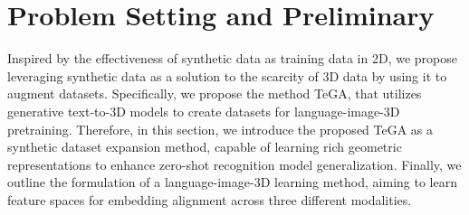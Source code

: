 \section{Problem Setting and Preliminary}
Inspired by the effectiveness of synthetic data as training data in 2D, we propose leveraging synthetic data as a solution to the scarcity of 3D data by using it to augment datasets. Specifically, we propose the method TeGA, that utilizes generative text-to-3D models to create datasets for language-image-3D pretraining.
Therefore, in this section, 
we introduce the proposed TeGA as a synthetic dataset expansion method, capable of learning rich geometric representations to enhance zero-shot recognition model generalization. 
Finally, we outline the formulation of a language-image-3D learning method, aiming to learn feature spaces for embedding alignment across three different modalities.

